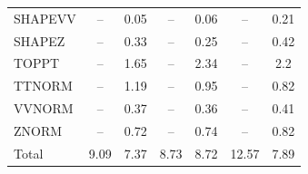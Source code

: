\begin{table}[H]
\begin{center}
\begin{footnotesize}
\begin{tabular}{lcccccc}
				SHAPEVV & -- &  0.05 & -- &  0.06 & -- &  0.21 \\
				SHAPEZ & -- &  0.33 & -- &  0.25 & -- &  0.42 \\
				TOPPT & -- &  1.65 & -- &  2.34 & -- &  2.2 \\
				TTNORM & -- &  1.19 & -- &  0.95 & -- &  0.82 \\
				VVNORM & -- &  0.37 & -- &  0.36 & -- &  0.41 \\
				ZNORM & -- &  0.72 & -- &  0.74 & -- &  0.82 \\
				Total &  9.09  &  7.37 &  8.73  &  8.72 &  12.57  &  7.89 \\ \hline \hline
			\end{tabular}
			\label{tab:SysUncertainties_900}
        \end{footnotesize}
	\end{center}
\end{table}


